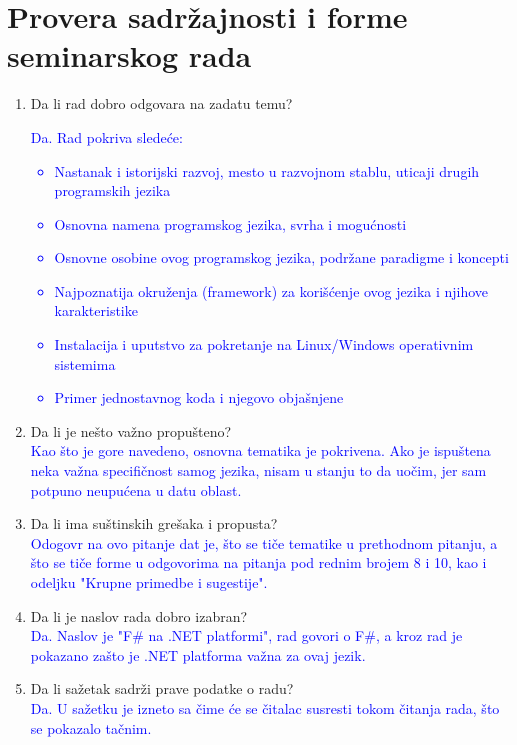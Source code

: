 \documentclass[a4paper]{report}
\newcommand{\odgovor}[1]{\textcolor{blue}{#1}}
\begin{document}
\section{Provera sadržajnosti i forme seminarskog rada}
\begin{enumerate}
\item Da li rad dobro odgovara na zadatu temu?\\
\odgovor{
Da. Rad pokriva sledeće:
\begin{itemize}
    \item Nastanak i istorijski razvoj, mesto u razvojnom stablu, uticaji drugih programskih jezika
    \item Osnovna namena programskog jezika, svrha i mogućnosti
    \item Osnovne osobine ovog programskog jezika, podržane paradigme i koncepti
    \item Najpoznatija okruženja (framework) za korišćenje ovog jezika i njihove karakteristike
    \item Instalacija i uputstvo za pokretanje na Linux/Windows operativnim sistemima
    \item Primer jednostavnog koda i njegovo objašnjene
\end{itemize}
}

\item Da li je nešto važno propušteno?\\
\odgovor{
Kao što je gore navedeno, osnovna tematika je pokrivena. Ako je ispuštena neka važna specifičnost samog jezika, nisam u stanju to da uočim, jer sam potpuno neupućena u datu oblast.
}

\item Da li ima suštinskih grešaka i propusta?\\
\odgovor{
Odogovr na ovo pitanje dat je, što se tiče tematike u prethodnom pitanju, a što se tiče forme u odgovorima na pitanja pod rednim brojem 8 i 10, kao i odeljku "Krupne primedbe i sugestije".
}

\item Da li je naslov rada dobro izabran?\\
\odgovor{
Da. Naslov je "F\# na .NET platformi", rad govori o F\#, a kroz rad je pokazano zašto je .NET platforma važna za ovaj jezik.
}

\item Da li sažetak sadrži prave podatke o radu?\\
\odgovor{
Da. U sažetku je izneto sa čime će se čitalac susresti tokom čitanja rada, što se pokazalo tačnim.
}


\end{enumerate}
\end{document}
